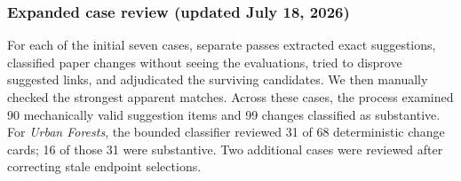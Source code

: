 \documentclass[
  11pt,
  letterpaper,
]{article}
\begin{document}
\subsubsection{Expanded case review (updated July 18,
2026)}\label{preliminary-case-review-july-16-2026}

For each of the initial seven cases, separate passes extracted exact
suggestions, classified paper changes without seeing the evaluations,
tried to disprove suggested links, and adjudicated the surviving
candidates. We then manually checked the strongest apparent matches.
Across these cases, the process examined 90 mechanically valid
suggestion items and 99 changes classified as substantive. For
\emph{Urban Forests}, the bounded classifier reviewed 31 of 68
deterministic change cards; 16 of those 31 were substantive. Two
additional cases were reviewed after correcting stale endpoint
selections.
\end{document}
